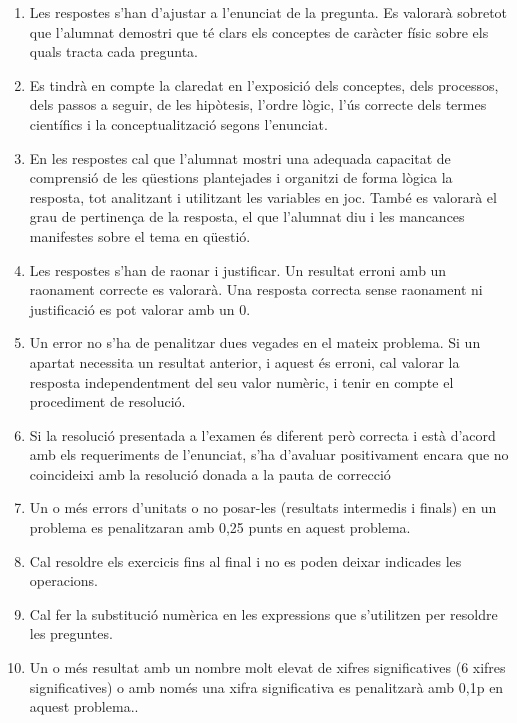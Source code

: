 \begin{enumerate}
  \item Les respostes s'han d'ajustar a l'enunciat de la pregunta. Es valorarà sobretot que l'alumnat demostri que té clars els conceptes de caràcter físic sobre els quals tracta cada pregunta.
  \item Es tindrà en compte la claredat en l'exposició dels conceptes, dels processos, dels passos a seguir, de les hipòtesis, l'ordre lògic, l'ús correcte dels termes científics i la conceptualització segons l'enunciat.
  \item En les respostes cal que l'alumnat mostri una adequada capacitat de comprensió de les qüestions plantejades i organitzi de forma lògica la resposta, tot analitzant i utilitzant les variables en joc. També es valorarà el grau de pertinença de la resposta, el que l'alumnat diu i les mancances manifestes sobre el tema en qüestió.
  \item Les respostes s'han de raonar i justificar. Un resultat erroni amb un raonament correcte es valorarà. Una resposta correcta sense raonament ni justificació es pot valorar amb un 0.
  \item Un error no s'ha de penalitzar dues vegades en el mateix problema. Si un apartat necessita un resultat anterior, i aquest és erroni, cal valorar la resposta independentment del seu valor numèric, i tenir en compte el procediment de resolució.
  \item Si la resolució presentada a l'examen és diferent però correcta i està d'acord amb els requeriments de l'enunciat, s'ha d'avaluar positivament encara que no coincideixi amb la resolució donada a la pauta de correcció
  \item Un o més errors d'unitats o no posar-les (resultats intermedis i finals) en un problema es penalitzaran amb 0,25 punts en aquest problema.
  \item Cal resoldre els exercicis fins al final i no es poden deixar indicades les operacions.
  \item Cal fer la substitució numèrica en les expressions que s'utilitzen per resoldre les preguntes.
  \item Un o més resultat amb un nombre molt elevat de xifres significatives (6 xifres significatives) o amb només una xifra significativa es penalitzarà amb 0,1p en aquest problema..
\end{enumerate}
